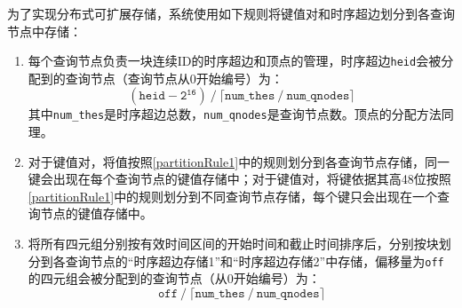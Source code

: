 \begin{figure}[!htb]
\label{thsdemo}
\end{figure}

为了实现分布式可扩展存储，系统使用如下规则将键值对和时序超边划分到各查询节点中存储：
\begin{enumerate}
    \item \label{partitionRule1} 每个查询节点负责一块连续ID的时序超边和顶点的管理，时序超边\texttt{heid}会被分配到的查询节点（查询节点从0开始编号）为：
    \begin{equation}
        \mathtt{(heid - 2^{16}) \ / \ \lceil num\_thes \ / \ num\_qnodes \rceil}
    \end{equation}
    其中\texttt{num\_thes}是时序超边总数，\texttt{num\_qnodes}是查询节点数。顶点的分配方法同理。
    \item 对于键值对，将值按照\ref{partitionRule1}中的规则划分到各查询节点存储，同一键会出现在每个查询节点的键值存储中；对于键值对，将键依据其高48位按照\ref{partitionRule1}中的规则划分到不同查询节点存储，每个键只会出现在一个查询节点的键值存储中。
    \item 将所有四元组分别按有效时间区间的开始时间和截止时间排序后，分别按块划分到各查询节点的“时序超边存储1”和“时序超边存储2”中存储，偏移量为\texttt{off}的四元组会被分配到的查询节点（从0开始编号）为：
    \begin{equation}
        \mathtt{off \ / \ \lceil num\_thes \ / \ num\_qnodes \rceil}
    \end{equation}
\end{enumerate}

